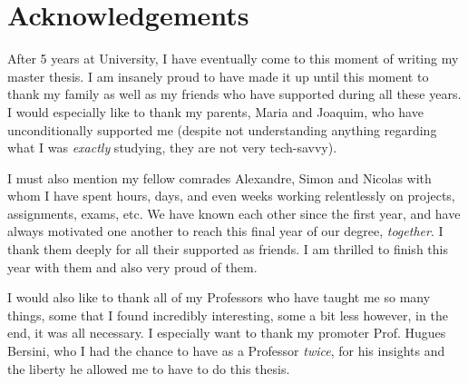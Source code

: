 
\chapter*{Acknowledgements}
After 5 years at University, I have eventually come to this moment of writing my master thesis. I am insanely proud to have made it up until this moment to thank my family as well as my friends who have supported during all these years. 
I would especially like to thank my parents, Maria and Joaquim, who have unconditionally supported me (despite not understanding anything regarding what I was \emph{exactly} studying, they are not very tech-savvy).

I must also mention my fellow comrades Alexandre, Simon and Nicolas with whom I have spent hours, days, and even weeks working relentlessly on projects, assignments, exams, etc. We have known each other since the first year, and have always motivated one another to reach this final year of our degree, \emph{together}. I thank them deeply for all their supported as friends. I am thrilled to finish this year with them and also very proud of them.

I would also like to thank all of my Professors who have taught me so many things, some that I found incredibly interesting, some a bit less however, in the end, it was all necessary. I especially want to thank my promoter Prof. Hugues Bersini, who I had the chance to have as a Professor \emph{twice}, for his insights and the liberty he allowed me to have to do this thesis.